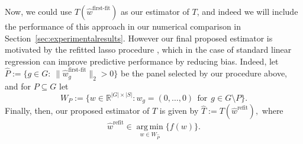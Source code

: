 \documentclass[10pt,twoside,openright]{report}
\DeclareMathOperator*{\argmin}{arg\,min}
\begin{document}
Now, we could use $T(\hat{w}^{\text{first-fit}})$ as our estimator of $T$, and indeed we will include the performance of this approach in our numerical comparison in Section~\ref{sec:experimentalresults}. However our final proposed estimator is motivated by the refitted \acrshort{lasso} procedure \citep[see][]{chzhen_lasso_2019}, which in the case of standard linear regression can improve predictive performance by reducing bias. 
Indeed, let $\hat{P} := \{g \in G: \ \|\hat{w}^{\text{first-fit}}_g\|_2 > 0 \}$ be the panel selected by our procedure above, and for $P\subseteq G$ let
\[
W_{P} := \{ w \in \mathbb{R}^{|G| \times |S|} : w_g = (0, \ldots, 0) \ \ \text{for} \ \ g \in G\setminus P \}.
\] 
Finally, then, our proposed estimator of $T$ is given by $\hat{T} := T(\hat{w}^{\text{refit}}),$ where  
\begin{equation} 
\label{eq:wrefit}
\hat{w}^{\text{refit}} \in  \argmin\limits_{w \in W_{\hat{P}}} \bigl\{f(w)\bigr\}.
\end{equation}
\end{document}
